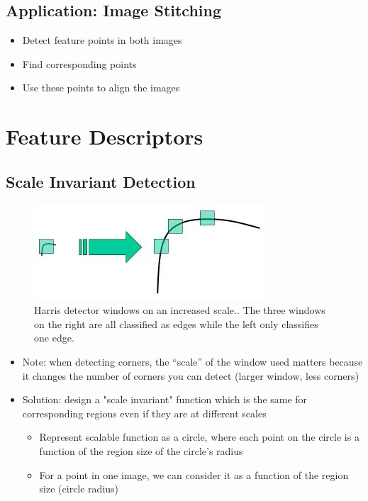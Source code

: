 \documentclass[letterpaper,12pt]{article}
\begin{document}
\subsection{Application: Image Stitching}
\begin{itemize}
 \item Detect feature points in both images
 \item Find corresponding points
 \item Use these points to align the images
\end{itemize}

\section{Feature Descriptors}

\subsection{Scale Invariant Detection}
\begin{figure}
 \centering
 \includegraphics[scale=0.5]{images/sift_scale_invariant.jpg}
 \caption{Harris detector windows on an increased scale.. The three windows on the right are all classified as edges while the left only classifies one edge.}
\end{figure}
\begin{itemize}
 \item Note: when detecting corners, the ``scale'' of the window used matters because it changes the number of corners you can detect (larger window, less corners)
 \item Solution: design a "scale invariant" function which is the same for corresponding regions even if they are at different scales
       \begin{itemize}
        \item Represent scalable function as a circle, where each point on the circle is a function of the region size of the circle's radius
        \item For a point in one image, we can consider it as a function of the region size (circle radius)
       \end{itemize}
\end{itemize}
\end{document}

